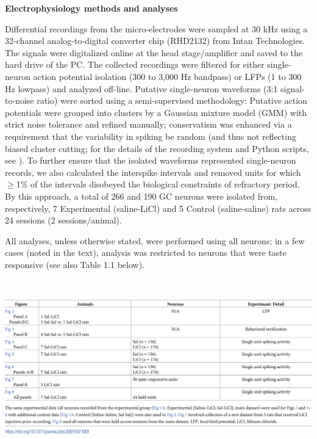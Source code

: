 \begin{refsection}
\smallskip
\noindent\textbf{Electrophysiology methods and analyses}\par
\noindent 
Differential recordings from the micro-electrodes were sampled at 30 kHz using a 32-channel analog-to-digital converter chip (RHD2132) from Intan Technologies. The signals were digitalized online at the head stage/amplifier and saved to the hard drive of the PC. The collected recordings were filtered for either single-neuron action potential isolation (300 to 3,000 Hz bandpass) or LFPs (1 to 300 Hz lowpass) and analyzed off-line. Putative single-neuron waveforms (3:1 signal-to-noise ratio) were sorted using a semi-supervised methodology: Putative action potentials were grouped into clusters by a Gaussian mixture model (GMM) with strict noise tolerance and refined manually; conservatism was enhanced via a requirement that the variability in spiking be random (and thus not reflecting biased cluster cutting; for the details of the recording system and Python scripts, see \cite{mukherjee2017a}). To further ensure that the isolated waveforms represented single-neuron records, we also calculated the interspike intervals and removed units for which \(\ge\)1\% of the intervals disobeyed the biological constraints of refractory period. By this approach, a total of 266 and 190 GC neurons were isolated from, respectively, 7 Experimental (saline-LiCl) and 5 Control (saline-saline) rats across 24 sessions (2 sessions/animal).

All analyses, unless otherwise stated, were performed using all neurons; in a few cases (noted in the text), analysis was restricted to neurons that were taste responsive (see also Table 1.1 below).

\\
\noindent
\begin{tabular}
\centering
    \includegraphics[width=\linewidth]{stone_2022_figs/journal.pbio.3001537.t001.png}
\end{tabular}
\\


\end{refsection}
